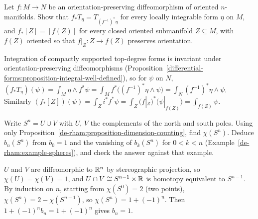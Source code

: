 \begin{exercise}\label{de-rham:exercise-pushforward-diffeomorphism}
Let $f \colon M \to N$ be an orientation-preserving diffeomorphism of oriented $n$-manifolds. Show that $f_*T_\eta = T_{(f^{-1})^*\eta}$ for every locally integrable form $\eta$ on $M$, and
$f_*[Z] = [f(Z)]$ for every closed oriented submanifold $Z \subseteq M$, with $f(Z)$ oriented so that $f|_Z \colon Z \to f(Z)$ preserves orientation.
\end{exercise}

\begin{solution}
Integration of compactly supported top-degree forms is invariant under orientation-preserving diffeomorphisms (Proposition~\ref{differential-forms:proposition-integral-well-defined}), so for $\psi$ on $N$,
$(f_*T_\eta)(\psi) = \int_M\eta \wedge f^*\psi = \int_Mf^*\bigl((f^{-1})^*\eta \wedge \psi\bigr) = \int_N(f^{-1})^*\eta \wedge \psi$. Similarly
$(f_*[Z])(\psi) = \int_Zi^*f^*\psi = \int_Z(f|_Z)^*\bigl(\psi|_{f(Z)}\bigr) = \int_{f(Z)}\psi$.
\end{solution}

\begin{exercise}\label{de-rham:exercise-spheres-euler}
Write $S^n = U \cup V$ with $U$, $V$ the complements of the north and south poles. Using only Proposition~\ref{de-rham:proposition-dimension-counting}, find $\chi(S^n)$. Deduce $b_n(S^n)$ from $b_0 = 1$ and the vanishing of
$b_k(S^n)$ for $0 < k < n$ (Example~\ref{de-rham:example-spheres}), and check the answer against that example.
\end{exercise}

\begin{solution}
$U$ and $V$ are diffeomorphic to $\mathbb{R}^n$ by stereographic projection, so $\chi(U) = \chi(V) = 1$, and $U \cap V \cong S^{n-1} \times \mathbb{R}$ is homotopy equivalent to $S^{n-1}$. By induction on $n$, starting from $\chi(S^0) = 2$
(two points), $\chi(S^n) = 2 - \chi(S^{n-1})$, so $\chi(S^n) = 1 + (-1)^n$. Then $1 + (-1)^nb_n = 1 + (-1)^n$ gives $b_n = 1$.
\end{solution}

